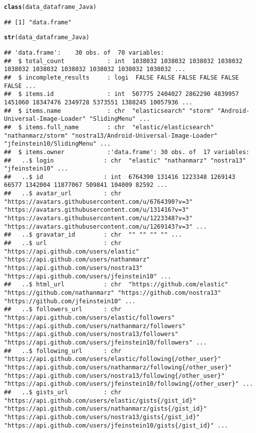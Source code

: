 \documentclass{article}\usepackage[]{graphicx}\usepackage[]{color}
\makeatletter
\newcommand{\hlstd}[1]{\textcolor[rgb]{0.345,0.345,0.345}{#1}}%
\newcommand{\hlkwd}[1]{\textcolor[rgb]{0.737,0.353,0.396}{\textbf{#1}}}%
\newenvironment{kframe}{%
 \def\at@end@of@kframe{}%
 \ifinner\ifhmode%
  \def\at@end@of@kframe{\end{minipage}}%
  \begin{minipage}{\columnwidth}%
 \fi\fi%
 \def\FrameCommand##1{\hskip\@totalleftmargin \hskip-\fboxsep
 \colorbox{shadecolor}{##1}\hskip-\fboxsep
     \hskip-\linewidth \hskip-\@totalleftmargin \hskip\columnwidth}%
 \MakeFramed {\advance\hsize-\width
   \@totalleftmargin\z@ \linewidth\hsize
   \@setminipage}}%
 {\par\unskip\endMakeFramed%
 \at@end@of@kframe}
\newenvironment{knitrout}{}{} %
\makeatother
\begin{document}
\begin{knitrout}
\begin{kframe}
\begin{alltt}
\hlkwd{class}\hlstd{(data_dataframe_Java)}
\end{alltt}
\begin{verbatim}
## [1] "data.frame"
\end{verbatim}
\begin{alltt}
\hlkwd{str}\hlstd{(data_dataframe_Java)}
\end{alltt}
\begin{verbatim}
## 'data.frame':	30 obs. of  70 variables:
##  $ total_count            : int  1038032 1038032 1038032 1038032 1038032 1038032 1038032 1038032 1038032 1038032 ...
##  $ incomplete_results     : logi  FALSE FALSE FALSE FALSE FALSE FALSE ...
##  $ items.id               : int  507775 2404027 2862290 4839957 1451060 18347476 2349728 5373551 1388245 10057936 ...
##  $ items.name             : chr  "elasticsearch" "storm" "Android-Universal-Image-Loader" "SlidingMenu" ...
##  $ items.full_name        : chr  "elastic/elasticsearch" "nathanmarz/storm" "nostra13/Android-Universal-Image-Loader" "jfeinstein10/SlidingMenu" ...
##  $ items.owner            :'data.frame':	30 obs. of  17 variables:
##   ..$ login              : chr  "elastic" "nathanmarz" "nostra13" "jfeinstein10" ...
##   ..$ id                 : int  6764390 131416 1223348 1269143 66577 1342004 11877067 509841 104009 82592 ...
##   ..$ avatar_url         : chr  "https://avatars.githubusercontent.com/u/6764390?v=3" "https://avatars.githubusercontent.com/u/131416?v=3" "https://avatars.githubusercontent.com/u/1223348?v=3" "https://avatars.githubusercontent.com/u/1269143?v=3" ...
##   ..$ gravatar_id        : chr  "" "" "" "" ...
##   ..$ url                : chr  "https://api.github.com/users/elastic" "https://api.github.com/users/nathanmarz" "https://api.github.com/users/nostra13" "https://api.github.com/users/jfeinstein10" ...
##   ..$ html_url           : chr  "https://github.com/elastic" "https://github.com/nathanmarz" "https://github.com/nostra13" "https://github.com/jfeinstein10" ...
##   ..$ followers_url      : chr  "https://api.github.com/users/elastic/followers" "https://api.github.com/users/nathanmarz/followers" "https://api.github.com/users/nostra13/followers" "https://api.github.com/users/jfeinstein10/followers" ...
##   ..$ following_url      : chr  "https://api.github.com/users/elastic/following{/other_user}" "https://api.github.com/users/nathanmarz/following{/other_user}" "https://api.github.com/users/nostra13/following{/other_user}" "https://api.github.com/users/jfeinstein10/following{/other_user}" ...
##   ..$ gists_url          : chr  "https://api.github.com/users/elastic/gists{/gist_id}" "https://api.github.com/users/nathanmarz/gists{/gist_id}" "https://api.github.com/users/nostra13/gists{/gist_id}" "https://api.github.com/users/jfeinstein10/gists{/gist_id}" ...

\end{verbatim}
\end{kframe}
\end{knitrout}
\end{document}
